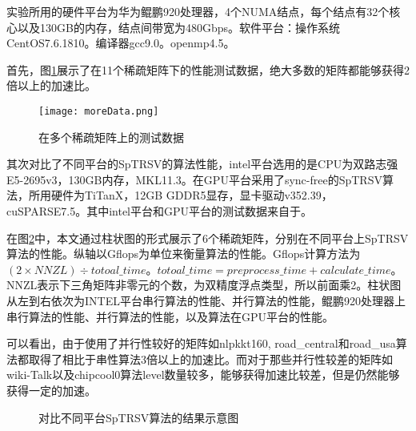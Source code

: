 实验所用的硬件平台为华为鲲鹏920处理器，4个NUMA结点，每个结点有32个核心以及130GB的内存，结点间带宽为480Gbps。软件平台：操作系统CentOS7.6.1810。编译器gcc9.0。openmp4.5。

首先，图\ref{在多个稀疏矩阵上的测试数据}展示了在11个稀疏矩阵下的性能测试数据，绝大多数的矩阵都能够获得2倍以上的加速比。
\begin{figure}[htbp]
    \centering
    \texttt{[image: moreData.png]}
    \caption{在多个稀疏矩阵上的测试数据}
    \label{在多个稀疏矩阵上的测试数据}
\end{figure}

其次对比了不同平台的SpTRSV的算法性能，intel平台选用的是CPU为双路志强E5-2695v3，130GB内存，MKL11.3。在GPU平台采用了sync-free的SpTRSV算法，所用硬件为TiTanX，12GB GDDR5显存，显卡驱动v352.39，cuSPARSE7.5。其中intel平台和GPU平台的测试数据来自于\cite{liuSyncFree2016}。

在图\ref{SpTRSVMulti-paltform}中，本文通过柱状图的形式展示了6个稀疏矩阵，分别在不同平台上SpTRSV算法的性能。纵轴以Gflops为单位来衡量算法的性能。Gflops计算方法为$(2 \times NNZL)  \div totoal\_time$。$totoal\_time = preprocess\_time + calculate\_time$。NNZL表示下三角矩阵非零元的个数，为双精度浮点类型，所以前面乘2。柱状图从左到右依次为INTEL平台串行算法的性能、并行算法的性能，鲲鹏920处理器上串行算法的性能、并行算法的性能，以及算法在GPU平台的性能。

可以看出，由于使用了并行性较好的矩阵如nlpkkt160, road\_central和road\_usa算法都取得了相比于串性算法3倍以上的加速比。而对于那些并行性较差的矩阵如wiki-Talk以及chipcool0算法level数量较多，能够获得加速比较差，但是仍然能够获得一定的加速。

\begin{figure}[htbp]
    \centering
    \quad
    \quad
    \quad
    \quad
    \quad
    \caption{对比不同平台SpTRSV算法的结果示意图}
    \label{SpTRSVMulti-paltform}
\end{figure}

